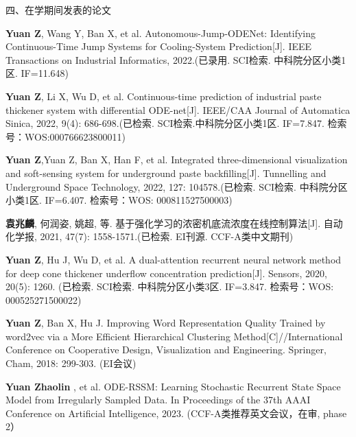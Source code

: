 \noindent 四、在学期间发表的论文 \par
\begin{enumerate}[label={[\arabic*]}]  %
\item \textbf{Yuan Z}, Wang Y, Ban X, et al. Autonomous-Jump-ODENet: Identifying Continuous-Time Jump Systems for Cooling-System Prediction[J]. IEEE Transactions on Industrial Informatics, 2022.(已录用. SCI检索. 中科院分区小类1区. IF=11.648) 
\item \textbf{Yuan Z}, Li X, Wu D, et al. Continuous-time prediction of industrial paste thickener system with differential ODE-net[J]. IEEE/CAA Journal of Automatica Sinica, 2022, 9(4): 686-698.(已检索. SCI检索.中科院分区小类1区. IF=7.847. 检索号：WOS:000766623800011)  
\item \textbf{Yuan Z},Yuan Z, Ban X, Han F, et al. Integrated three-dimensional visualization and soft-sensing system for underground paste backfilling[J]. Tunnelling and Underground Space Technology, 2022, 127: 104578.(已检索. SCI检索. 中科院分区小类1区. IF=6.407. 检索号：WOS: 000811527500003) 
\item \textbf{袁兆麟}, 何润姿, 姚超, 等. 基于强化学习的浓密机底流浓度在线控制算法[J]. 自动化学报, 2021, 47(7): 1558-1571.(已检索. EI刊源. CCF-A类中文期刊) 
\item \textbf{Yuan Z}, Hu J, Wu D, et al. A dual-attention recurrent neural network method for deep cone thickener underflow concentration prediction[J]. Sensors, 2020, 20(5): 1260. (已检索. SCI检索. 中科院分区小类3区. IF=3.847. 检索号：WOS: 000525271500022)  
\item \textbf{Yuan Z}, Ban X, Hu J. Improving Word Representation Quality Trained by word2vec via a More Efficient Hierarchical Clustering Method[C]//International Conference on Cooperative Design, Visualization and Engineering. Springer, Cham, 2018: 299-303. (EI会议)
\item \textbf{Yuan Zhaolin} , et al. ODE-RSSM: Learning Stochastic Recurrent State Space Model from Irregularly Sampled Data. In Proceedings of the 37th AAAI Conference on Artificial Intelligence, 2023. (CCF-A类推荐英文会议，在审, phase 2）

\end{enumerate}

